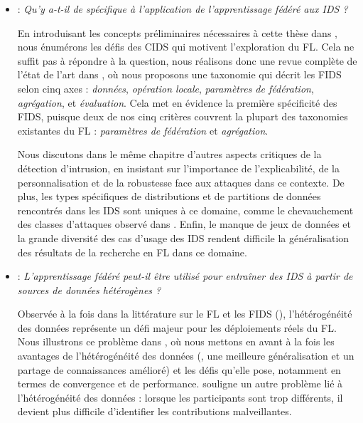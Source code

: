 \begin{itemize}[listparindent=\parindent,itemsep=.6\baselineskip]

  \item {} : \emph{Qu'y a-t-il de spécifique à l'application de l'apprentissage fédéré aux IDS ?}

  En introduisant les concepts préliminaires nécessaires à cette thèse dans , nous énumérons les défis des CIDS qui motivent l'exploration du FL.  
  Cela ne suffit pas à répondre à la question, nous réalisons donc une revue complète de l'état de l'art dans , où nous proposons une taxonomie qui décrit les FIDS selon cinq axes : \emph{données}, \emph{opération locale}, \emph{paramètres de fédération}, \emph{agrégation}, et \emph{évaluation}.  
  Cela met en évidence la première spécificité des FIDS, puisque deux de nos cinq critères couvrent la plupart des taxonomies existantes du FL : \emph{paramètres de fédération} et \emph{agrégation}.  

  Nous discutons dans le même chapitre d'autres aspects critiques de la détection d'intrusion, en insistant sur l'importance de l'explicabilité, de la personnalisation et de la robustesse face aux attaques dans ce contexte.  
  De plus, les types spécifiques de distributions et de partitions de données rencontrés dans les IDS sont uniques à ce domaine, comme le chevauchement des classes d'attaques observé dans .  
  Enfin, le manque de jeux de données et la grande diversité des cas d'usage des IDS rendent difficile la généralisation des résultats de la recherche en FL dans ce domaine.

  \item {} : \emph{L'apprentissage fédéré peut-il être utilisé pour entraîner des IDS à partir de sources de données hétérogènes ?}

  Observée à la fois dans la littérature sur le FL et les FIDS (\cf {}), l'hétérogénéité des données représente un défi majeur pour les déploiements réels du FL.  
  Nous illustrons ce problème dans , où nous mettons en avant à la fois les avantages de l'hétérogénéité des données (\eg, une meilleure généralisation et un partage de connaissances amélioré) et les défis qu'elle pose, notamment en termes de convergence et de performance.  
   souligne un autre problème lié à l'hétérogénéité des données : lorsque les participants sont trop différents, il devient plus difficile d'identifier les contributions malveillantes.


\end{itemize}
